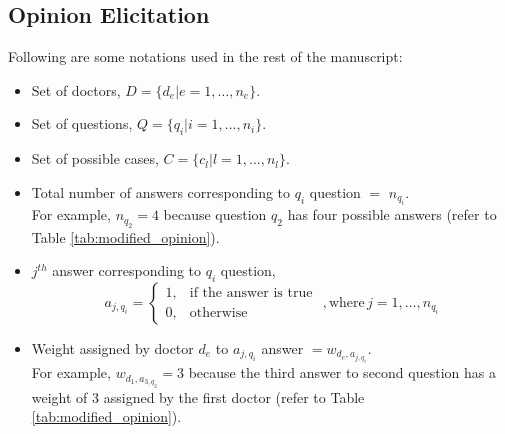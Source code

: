 \subsection{Opinion Elicitation}
Following are some notations used in the rest of the manuscript:
\begin{itemize}
	
	\item Set of doctors, \( D = \{ d_{e}\vert e = 1,\ldots ,n_e\}\).
	
	\item Set of questions, \( Q = \{ q_{i}\vert i = 1,\ldots ,n_i\}\).
	
	\item Set of possible cases, \( C = \{ c_{l}\vert l = 1,\ldots ,n_l\}\).
	
	\item Total number of answers corresponding to $q_{i} $ question $=$  $n_{q_{i}}$. \\For example, $n_{q_{2}}=4$ because question $q_{2}$ has four possible answers (refer to Table \ref{tab:modified_opinion}).
	\item $j^{th}$ answer corresponding to $q_{i}$ question,\begin{displaymath}
		a_{j,q_{i}}= 
		\begin{cases}
			1,& \text{if the answer is true } \\
			0,              & \text{otherwise}
		\end{cases}, \text{where} \, j = 1,\ldots , n_{q_{i}}
	\end{displaymath}
	
	\item Weight assigned by doctor $d_{e}$ to $a_{j,q_{i}}$ answer $=  w_{d_{e},a_{j,q_{i}}}$. \\For example, $ w_{d_{1},a_{3,q_{2}}}=3$ because the third answer to second question has a weight of 3 assigned by the first doctor (refer to Table \ref{tab:modified_opinion}).
	
\end{itemize}

